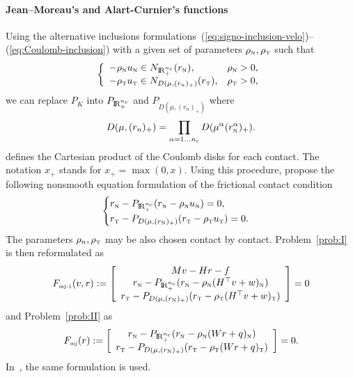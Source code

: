 \paragraph{Jean--Moreau's and Alart-Curnier's functions}

Using the alternative inclusions formulations~(\ref{eq:signo-inclusion-velo})--(\ref{eq:Coulomb-inclusion}) with a given set of parameters $\rho_{\hbox{\tiny{N}}},\rho_{\hbox{\tiny{T}}}$ such that
\begin{equation} 
  \label{eq:inclusion-rhorho}
  \left\{ \begin{array}{ll}
    -\rho_\n u_\n \in N_{\RR^{n_c}_+}(r_\n), & \rho_\n>0, \\
    -\rho_\t u_{\t} \in N_{D(\mu,(r_{n})_+)}(r_\t), & \rho_\t>0,
  \end{array}\right.
\end{equation}
 we can replace $P_K$ into $P_{\mathrm{I\!R}^{n_c}_+}$ and $P_{D(\mu,(r_{n})_+)}$ where 
\begin{equation}
  \label{eq:diskR-prod}
  D(\mu,(r_{n})_+) = \prod_{\alpha=1\ldots n_c} D(\mu^{\alpha} (r_{\n}^\alpha)_+).
\end{equation}
defines the Cartesian product of the Coulomb disks for each contact. The notation $x_+$ stands for $x_+ = \max(0,x)$. Using this procedure, \citet{Jean.Moreau1987} propose the following nonsmooth equation formulation of the frictional contact condition
\begin{equation}
  \label{eq:Moreau--Jean-1}
    \begin{cases}
    r_\n - P_{\RR^{n_c}_+}(r_\n - \rho_\n  u_\n) = 0, \\
    r_\t - P_{D(\mu, (r_{\n})_+)}(r_\t - \rho_\t u_\t   )=0.
  \end{cases}
\end{equation}
The parameters $\rho_n,\rho_{\hbox{\tiny{T}}}$ may be also chosen contact by contact. Problem~\ref{prob:I} is then reformulated as
\begin{equation}
  \label{eq:MJ-I}
  F_{\mjone}(v,r) := \left[
    \begin{array}{c}
    Mv - Hr - f \\
    r_\n - P_{\RR^{n_c}_+}(r_\n - \rho_\n (H^\top v + w)_\n) \\
    r_\t - P_{D(\mu, (r_{\n})_+)}(r_\t - \rho_\t (H^\top v + w)_\t   ) 
  \end{array}\right] =0
\end{equation}
and  Problem~\ref{prob:II}  as
\begin{equation}
  \label{eq:MJ-II}
    F_{\mjtwo}(r) := \left[ \begin{array}{c}
    r_\n - P_{\RR^{n_c}_+}(r_\n - \rho_\n (W r +  q)_\n) \\
    r_\t - P_{D(\mu, (r_{\n})_+)}(r_\t - \rho_\t (Wr+q)_\t   ) 
  \end{array}\right] =0.
\end{equation}
In~\cite{Christensen.Klarbring.ea1998}, the same formulation is used.

